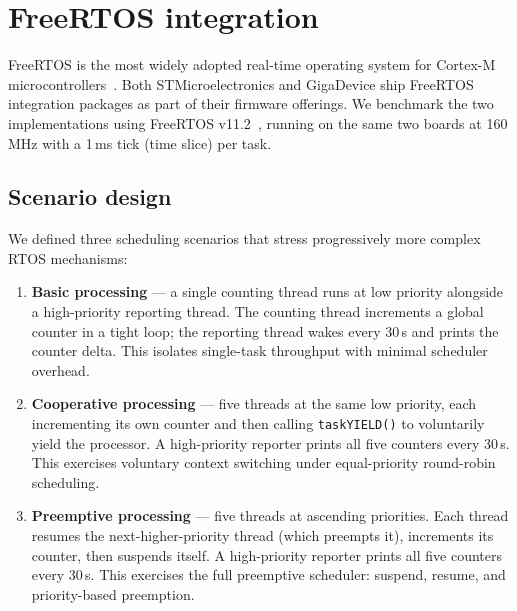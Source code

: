 \section{FreeRTOS integration}
\label{sec:gd32-freertos}

FreeRTOS is the most widely adopted real-time operating system for Cortex-M
microcontrollers~\cite{freertos}. Both STMicroelectronics and GigaDevice ship FreeRTOS
integration packages as part of their firmware offerings. We benchmark the two
implementations using FreeRTOS v11.2~\cite{freertos-v11}, running on the same two boards
at 160\,MHz with a 1\,ms tick (time slice) per task.

\subsection{Scenario design}
\label{sec:gd32-freertos-scenarios}

We defined three scheduling scenarios that stress progressively more complex RTOS
mechanisms:

\begin{enumerate}
  \item \textbf{Basic processing} --- a single counting thread runs at low priority
    alongside a high-priority reporting thread. The counting thread increments a global
    counter in a tight loop; the reporting thread wakes every 30\,s and prints the counter
    delta. This isolates single-task throughput with minimal scheduler overhead.
  \item \textbf{Cooperative processing} --- five threads at the same low priority, each
    incrementing its own counter and then calling \texttt{taskYIELD()} to voluntarily yield
    the processor. A high-priority reporter prints all five counters every 30\,s. This
    exercises voluntary context switching under equal-priority round-robin scheduling.
  \item \textbf{Preemptive processing} --- five threads at ascending priorities. Each
    thread resumes the next-higher-priority thread (which preempts it), increments its
    counter, then suspends itself. A high-priority reporter prints all five counters every
    30\,s. This exercises the full preemptive scheduler: suspend, resume, and
    priority-based preemption.
\end{enumerate}

